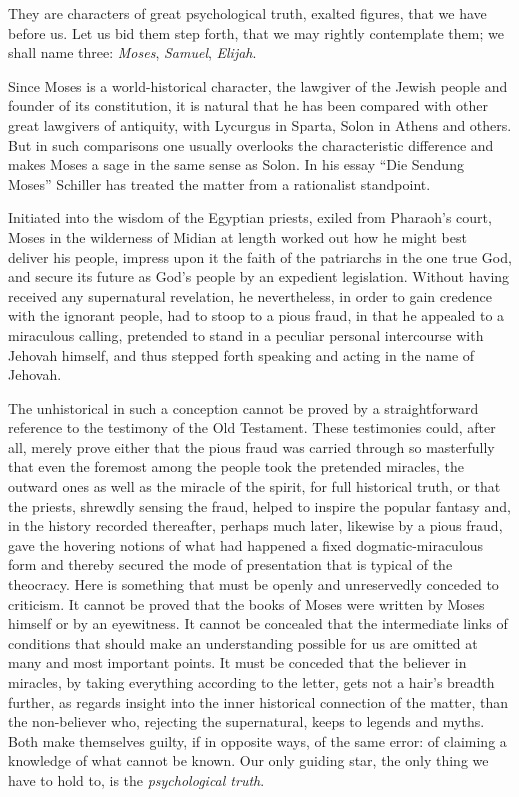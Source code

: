 \documentclass[12pt,a4paper,openany]{book}
\newcommand{\opage}[1]{\marginnote{\footnotesize\textit{[#1]}}}
\begin{document}
They are characters of great psychological truth,
exalted figures, that we have before us. Let us bid them
step forth, that we may rightly contemplate them; we shall name
three: \emph{Moses}, \emph{Samuel}, \emph{Elijah}.

Since Moses is a world-historical character, the
lawgiver of the Jewish people and founder of its constitution,
it is natural that he has been compared
with other great lawgivers of antiquity, with Lycurgus
in Sparta, Solon in Athens and others. But in such comparisons
one usually overlooks the characteristic
difference and makes Moses a sage in the same sense
as Solon. In his essay ``Die Sendung Moses''
Schiller has treated the matter from a rationalist standpoint.


Initiated into the wisdom of the Egyptian priests, exiled
from Pharaoh's court, Moses in the wilderness of Midian at length
worked out how he might best deliver his
people, impress upon it the faith of the patriarchs in the one
true God, and secure its future as God's people by
an expedient legislation. Without having received
any supernatural revelation, he nevertheless, in order
to gain credence with the ignorant people, had to
stoop to a pious fraud, in that he appealed
to a miraculous calling, pretended to stand
\setcounter{footnote}{0}%
\opage{24}in a peculiar personal intercourse with Jehovah himself, and
thus stepped forth speaking and acting in the name
of Jehovah.

The unhistorical in such a conception cannot be
proved by a straightforward reference to the testimony of the Old
Testament. These testimonies could, after all, merely
prove either that the pious fraud was carried through so
masterfully that even the foremost among the people
took the pretended miracles, the outward ones as well
as the miracle of the spirit, for full historical truth, or that
the priests, shrewdly sensing the fraud, helped
to inspire the popular fantasy and, in the history recorded thereafter,
perhaps much later, likewise by a pious
fraud, gave the hovering notions of what had happened
a fixed dogmatic-miraculous form and thereby secured
the mode of presentation that is typical of the theocracy.
Here is something that must be openly and unreservedly conceded
to criticism. It cannot be proved that the books of Moses
were written by Moses himself or by an eyewitness.
It cannot be concealed that the intermediate links of conditions
that should make an understanding possible for us are omitted at many
and most important points. It must be conceded
that the believer in miracles, by taking everything according to the letter,
gets not a hair's breadth further, as regards insight into the inner historical connection of the matter,
than the
non-believer who, rejecting the supernatural,
keeps to legends and myths. Both make themselves guilty,
if in opposite ways, of the same error: of
claiming a knowledge of what cannot be known. Our
only guiding star, the only thing we have to hold to,
is the \emph{psychological truth}.
\end{document}

